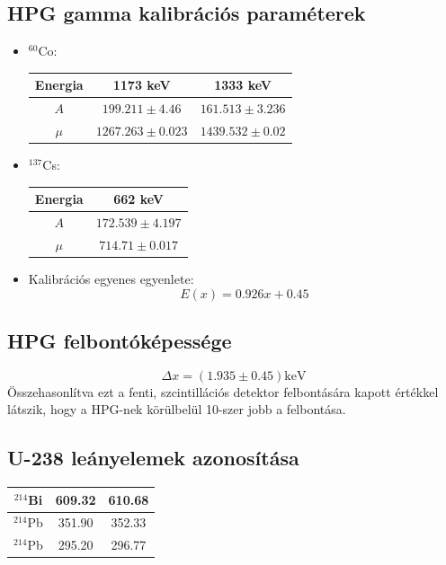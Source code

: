 \documentclass[12pt,a4paper]{article}
\begin{document}
\subsection{HPG gamma kalibrációs paraméterek}
\begin{itemize}
\item $^{60}$Co:
\begin{center}
\begin{tabular}{|c|c||c|}
\hline
Energia & 1173 keV & 1333 keV \\ 
\hline
$A$ & $199.211 \pm 4.46$ & $161.513 \pm 3.236$\\
\hline
$\mu$ & $1267.263 \pm 0.023$ & $1439.532 \pm 0.02$\\
\hline
\end{tabular}
\end{center}
\item $^{137}$Cs:
\begin{center}

\begin{tabular}{|c|c|}
\hline
Energia & 662 keV \\ 
\hline
$A$ & $172.539 \pm 4.197$\\
\hline
$\mu$ & $714.71 \pm 0.017$\\
\hline
\end{tabular}
\end{center}
\item Kalibrációs egyenes egyenlete:
\begin{equation*}
E(x)=0.926x +0.45
\end{equation*}
\end{itemize}
\subsection{HPG felbontóképessége}
\begin{equation*}
\Delta x=(1.935 \pm 0.45)\mathrm{keV}
\end{equation*}
Összehasonlítva ezt a fenti, szcintillációs detektor felbontására kapott értékkel látszik, hogy a HPG-nek körülbelül 10-szer jobb a felbontása.
\subsection{U-238 leányelemek azonosítása}
\begin{center}
\begin{tabular}{|c|c|c|}
\hline
$^{214}$Bi & 609.32 & 610.68\\
\hline
$^{214}$Pb & 351.90 & 352.33\\
\hline
$^{214}$Pb & 295.20 & 296.77\\ 
\hline
\end{tabular}
\end{center}
\end{document}
